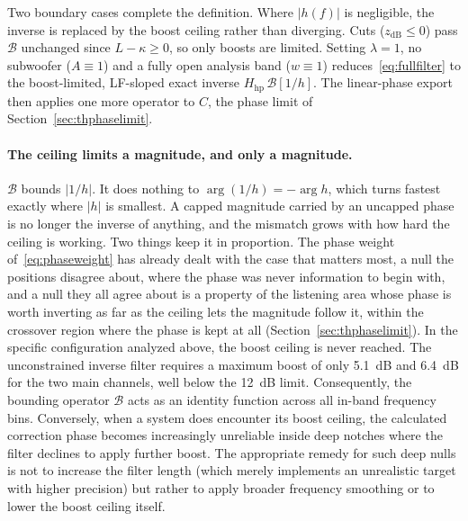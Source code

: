 Two boundary cases complete the definition. Where $|h(f)|$ is negligible, the inverse is replaced by the boost ceiling rather than diverging. Cuts ($z_{\mathrm{dB}}\le 0$) pass $\mathcal{B}$ unchanged since $L-\kappa\ge 0$, so only boosts are limited. Setting $\lambda=1$, no subwoofer ($A\equiv1$) and a fully open analysis band ($w\equiv1$) reduces~\eqref{eq:fullfilter} to the boost-limited, LF-sloped exact inverse $H_{\mathrm{hp}}\,\mathcal{B}[1/h]$. The linear-phase export then applies one more operator to $C$, the phase limit of Section~\ref{sec:thphaselimit}.

\paragraph{The ceiling limits a magnitude, and only a magnitude.} $\mathcal{B}$ bounds $|1/h|$. It does nothing to $\arg(1/h)=-\arg h$, which turns fastest exactly where $|h|$ is smallest. A capped magnitude carried by an uncapped phase is no longer the inverse of anything, and the mismatch grows with how hard the ceiling is working. Two things keep it in proportion. The phase weight of~\eqref{eq:phaseweight} has already dealt with the case that matters most, a null the positions disagree about, where the phase was never information to begin with, and a null they all agree about is a property of the listening area whose phase is worth inverting as far as the ceiling lets the magnitude follow it, within the crossover region where the phase is kept at all (Section~\ref{sec:thphaselimit}). In the specific configuration analyzed above, the boost ceiling is never reached. The unconstrained inverse filter requires a maximum boost of only \SI{5.1}{\dB} and \SI{6.4}{\dB} for the two main channels, well below the \SI{12}{\dB} limit. Consequently, the bounding operator $\mathcal{B}$ acts as an identity function across all in-band frequency bins. Conversely, when a system does encounter its boost ceiling, the calculated correction phase becomes increasingly unreliable inside deep notches where the filter declines to apply further boost. The appropriate remedy for such deep nulls is not to increase the filter length (which merely implements an unrealistic target with higher precision) but rather to apply broader frequency smoothing or to lower the boost ceiling itself.

